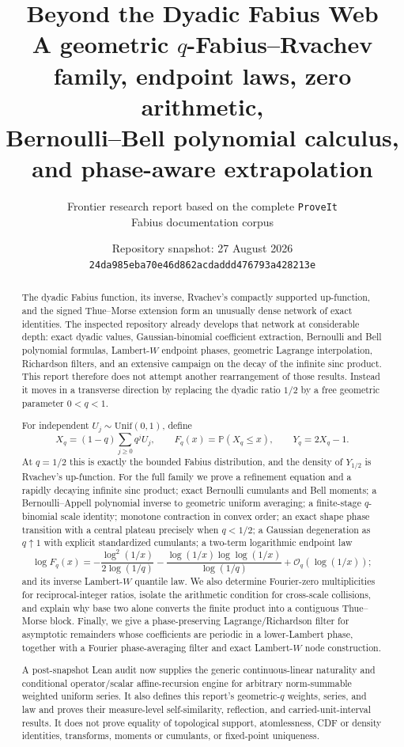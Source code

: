 \documentclass[11pt,oneside]{article}
\title{\bfseries Beyond the Dyadic Fabius Web\\[0.35em]
\large A geometric $q$-Fabius--Rvachev family, endpoint laws, zero arithmetic,\\
Bernoulli--Bell polynomial calculus, and phase-aware extrapolation}
\author{\small Frontier research report based on the complete \texttt{ProveIt}\\Fabius documentation corpus}
\date{Repository snapshot: 27 August 2026\\
\small \texttt{24da985eba70e46d862acdaddd476793a428213e}}
\theoremstyle{definition}
\theoremstyle{remark}
\newcommand{\Prob}{\mathbb P}
\newcommand{\bigO}{\mathcal O}
\begin{document}
\maketitle

\begin{abstract}
The dyadic Fabius function, its inverse, Rvachev's compactly supported up-function,
and the signed Thue--Morse extension form an unusually dense network of exact identities.
The inspected repository already develops that network at considerable depth: exact dyadic
values, Gaussian-binomial coefficient extraction, Bernoulli and Bell polynomial formulas,
Lambert-$W$ endpoint phases, geometric Lagrange interpolation, Richardson filters, and an
extensive campaign on the decay of the infinite sinc product.  This report therefore does
not attempt another rearrangement of those results.  Instead it moves in a transverse
direction by replacing the dyadic ratio $1/2$ by a free geometric parameter $0<q<1$.

For independent $U_j\sim\mathrm{Unif}(0,1)$, define
\[
 X_q=(1-q)\sum_{j\ge0}q^jU_j,
 \qquad F_q(x)=\Prob(X_q\le x),
 \qquad Y_q=2X_q-1.
\]
At $q=1/2$ this is exactly the bounded Fabius distribution, and the density of $Y_{1/2}$
is Rvachev's up-function.  For the full family we prove a refinement equation and a
rapidly decaying infinite sinc product; exact Bernoulli cumulants and Bell moments; a
Bernoulli--Appell polynomial inverse to geometric uniform averaging; a finite-stage
$q$-binomial scale identity; monotone contraction in convex order; an exact shape phase
transition with a central plateau precisely when $q<1/2$; a Gaussian degeneration as
$q\uparrow1$ with explicit standardized cumulants; a two-term logarithmic endpoint law
\[
 \log F_q(x)
 =-\frac{\log^2(1/x)}{2\log(1/q)}
  -\frac{\log(1/x)\log\log(1/x)}{\log(1/q)}
  +\bigO_q(\log(1/x));
\]
and its inverse Lambert-$W$ quantile law.  We also determine Fourier-zero multiplicities
for reciprocal-integer ratios, isolate the arithmetic condition for cross-scale collisions,
and explain why base two alone converts the finite product into a contiguous Thue--Morse
block.  Finally, we give a phase-preserving Lagrange/Richardson filter for asymptotic
remainders whose coefficients are periodic in a lower-Lambert phase, together with a
Fourier phase-averaging filter and exact Lambert-$W$ node construction.

A post-snapshot Lean audit now supplies the generic continuous-linear naturality and
conditional operator/scalar affine-recursion engine for arbitrary norm-summable weighted
uniform series.  It also defines this report's geometric-\(q\) weights, series, and law and
proves their measure-level self-similarity, reflection, and carried-unit-interval results.
It does not prove equality of topological support, atomlessness, CDF or density identities,
transforms, moments or cumulants, or fixed-point uniqueness.


\end{abstract}
\end{document}
